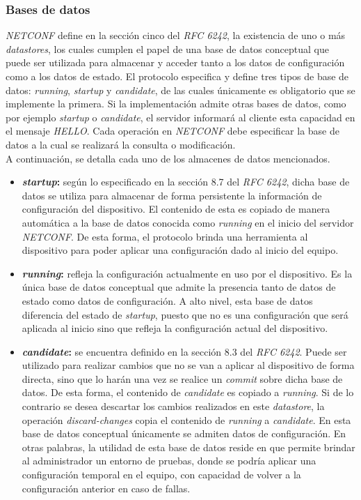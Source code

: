   \subsubsection{Bases de datos}
  \textit{NETCONF} define en la sección cinco del \textit{RFC 6242}, la existencia de uno o más \textit{datastores}, los cuales cumplen el papel de una base de datos conceptual que puede ser utilizada para almacenar y acceder tanto a los datos de configuración como a los datos de estado. El protocolo especifica y define tres tipos de base de datos: \textit{running}, \textit{startup} y \textit{candidate}, de las cuales únicamente es obligatorio que se implemente la primera. Si la implementación admite otras bases de datos, como por ejemplo \textit{startup} o \textit{candidate}, el servidor informará al cliente esta capacidad en el mensaje \textit{HELLO}. Cada operación en \textit{NETCONF} debe especificar la base de datos a la cual se realizará la consulta o modificación.
  \\

  A continuación, se detalla cada uno de los almacenes de datos mencionados.
\begin{itemize}
	\item \textbf{\textit{startup}:} según lo especificado en la sección 8.7 del \textit{RFC 6242}, dicha base de datos se utiliza para almacenar de forma persistente la información de configuración del dispositivo. El contenido de esta es copiado de manera automática a la base de datos conocida como \textit{running} en el inicio del servidor \textit{NETCONF}. De esta forma, el protocolo brinda una herramienta al dispositivo para poder aplicar una configuración dado al inicio del equipo. 
	\item \textbf{\textit{running}:} refleja la configuración actualmente en uso por el dispositivo. Es la única base de datos conceptual que admite la presencia tanto de datos de estado como datos de configuración. A alto nivel, esta base de datos diferencia del estado de \textit{startup}, puesto que no es una configuración que será aplicada al inicio sino que refleja la configuración actual del dispositivo.
	\item \textbf{\textit{candidate}:} se encuentra definido en la sección 8.3 del \textit{RFC 6242}. Puede ser utilizado para realizar cambios que no se van a aplicar al dispositivo de forma directa, sino que lo harán una vez se realice un \textit{commit} sobre dicha base de datos. De esta forma, el contenido de \textit{candidate} es copiado a \textit{running}. Si de lo contrario se desea descartar los cambios realizados en este \textit{datastore}, la operación \textit{discard-changes} copia el contenido de \textit{running} a \textit{candidate}. En esta base de datos conceptual únicamente se admiten datos de configuración. En otras palabras, la utilidad de esta base de datos reside en que permite brindar al administrador un entorno de pruebas, donde se podría aplicar una configuración temporal en el equipo, con capacidad de volver a la configuración anterior en caso de fallas.
\end{itemize}


